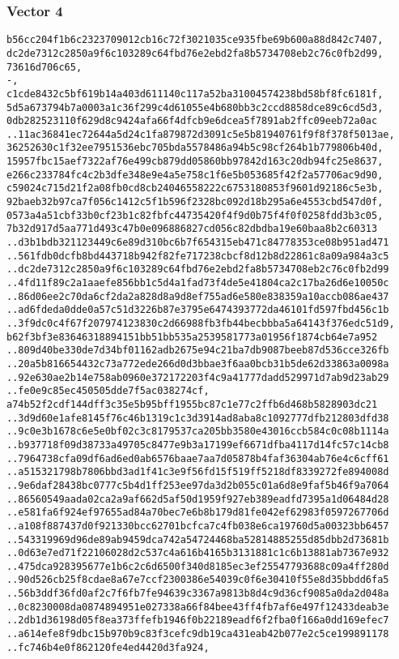 \documentclass[
]{article}
\begin{document}
\hypertarget{vector-4-2}{%
\subsubsection{Vector 4}\label{vector-4-2}}

\begin{verbatim}
b56cc204f1b6c2323709012cb16c72f3021035ce935fbe69b600a88d842c7407,
dc2de7312c2850a9f6c103289c64fbd76e2ebd2fa8b5734708eb2c76c0fb2d99,
73616d706c65,
-,
c1cde8432c5bf619b14a403d611140c117a52ba31004574238bd58bf8fc6181f,
5d5a673794b7a0003a1c36f299c4d61055e4b680bb3c2ccd8858dce89c6cd5d3,
0db282523110f629d8c9424afa66f4dfcb9e6dcea5f7891ab2ffc09eeb72a0ac
..11ac36841ec72644a5d24c1fa879872d3091c5e5b81940761f9f8f378f5013ae,
36252630c1f32ee7951536ebc705bda5578486a94b5c98cf264b1b779806b40d,
15957fbc15aef7322af76e499cb879dd05860bb97842d163c20db94fc25e8637,
e266c233784fc4c2b3dfe348e9e4a5e758c1f6e5b053685f42f2a57706ac9d90,
c59024c715d21f2a08fb0cd8cb24046558222c6753180853f9601d92186c5e3b,
92baeb32b97ca7f056c1412c5f1b596f2328bc092d18b295a6e4553cbd547d0f,
0573a4a51cbf33b0cf23b1c82fbfc44735420f4f9d0b75f4f0f0258fdd3b3c05,
7b32d917d5aa771d493c47b0e096886827cd056c82dbdba19e60baa8b2c60313
..d3b1bdb321123449c6e89d310bc6b7f654315eb471c84778353ce08b951ad471
..561fdb0dcfb8bd443718b942f82fe717238cbcf8d12b8d22861c8a09a984a3c5
..dc2de7312c2850a9f6c103289c64fbd76e2ebd2fa8b5734708eb2c76c0fb2d99
..4fd11f89c2a1aaefe856bb1c5d4a1fad73f4de5e41804ca2c17ba26d6e10050c
..86d06ee2c70da6cf2da2a828d8a9d8ef755ad6e580e838359a10accb086ae437
..ad6fdeda0dde0a57c51d3226b87e3795e6474393772da46101fd597fbd456c1b
..3f9dc0c4f67f207974123830c2d66988fb3fb44becbbba5a64143f376edc51d9,
b62f3bf3e83646318894151bb51bb535a2539581773a01956f1874cb64e7a952
..809d40be330de7d34bf01162adb2675e94c21ba7db9087beeb87d536cce326fb
..20a5b816654432c73a772ede266d0d3bbae3f6aa0bcb31b5de62d33863a0098a
..92e630ae2b14e758ab0960e372172203f4c9a41777dadd529971d7ab9d23ab29
..fe0e9c85ec450505dde7f5ac038274cf,
a74b52f2cdf144dff3c35e5b95bff1955bc87c1e77c2ffb6d468b5828903dc21
..3d9d60e1afe8145f76c46b1319c1c3d3914ad8aba8c1092777dfb212803dfd38
..9c0e3b1678c6e5e0bf02c3c8179537ca205bb3580e43016ccb584c0c08b1114a
..b937718f09d38733a49705c8477e9b3a17199ef6671dfba4117d14fc57c14cb8
..7964738cfa09df6ad6ed0ab6576baae7aa7d05878b4faf36304ab76e4c6cff61
..a515321798b7806bbd3ad1f41c3e9f56fd15f519ff5218df8339272fe894008d
..9e6daf28438bc0777c5b4d1ff253ee97da3d2b055c01a6d8e9faf5b46f9a7064
..86560549aada02ca2a9af662d5af50d1959f927eb389eadfd7395a1d06484d28
..e581fa6f924ef97655ad84a70bec7e6b8b179d81fe042ef62983f0597267706d
..a108f887437d0f921330bcc62701bcfca7c4fb038e6ca19760d5a00323bb6457
..543319969d96de89ab9459dca742a54724468ba52814885255d85dbb2d73681b
..0d63e7ed71f22106028d2c537c4a616b4165b3131881c1c6b13881ab7367e932
..475dca928395677e1b6c2c6d6500f340d8185ec3ef25547793688c09a4ff280d
..90d526cb25f8cdae8a67e7ccf2300386e54039c0f6e30410f55e8d35bbdd6fa5
..56b3ddf36fd0af2c7f6fb7fe94639c3367a9813b8d4c9d36cf9085a0da2d048a
..0c8230008da0874894951e027338a66f84bee43ff4fb7af6e497f12433deab3e
..2db1d36198d05f8ea373ffefb1946f0b22189eadf6f2fba0f166a0dd169efec7
..a614efe8f9dbc15b970b9c83f3cefc9db19ca431eab42b077e2c5ce199891178
..fc746b4e0f862120fe4ed4420d3fa924,
\end{verbatim}
\end{document}
